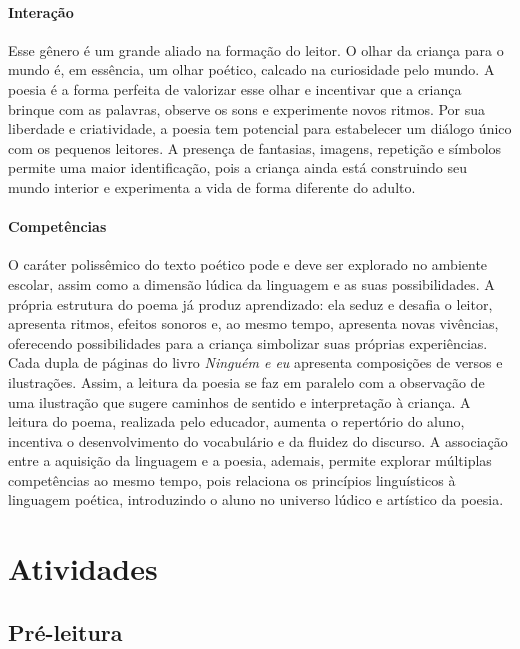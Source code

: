 \documentclass[11pt]{extarticle}
\begin{document}
\paragraph{Interação} Esse gênero é um grande aliado na formação do leitor. O olhar da criança para o mundo é, em essência, um olhar poético, calcado na curiosidade pelo mundo. A poesia é a forma perfeita de valorizar esse olhar e incentivar que a criança brinque com as palavras, observe os sons e experimente novos ritmos. Por sua liberdade e criatividade, a poesia tem potencial para estabelecer um diálogo único com os pequenos leitores. A presença de fantasias, imagens, repetição e símbolos permite uma maior identificação, pois a criança ainda está construindo seu mundo interior e experimenta a vida de forma diferente do adulto. 

\paragraph{Competências} 
O caráter polissêmico do texto poético pode e deve ser explorado no ambiente escolar, assim como a dimensão lúdica da linguagem e as suas possibilidades. A própria estrutura do poema já produz aprendizado: ela seduz e desafia o leitor, apresenta ritmos, efeitos sonoros e, ao mesmo tempo, apresenta novas vivências, oferecendo possibilidades para a criança simbolizar suas próprias experiências. Cada dupla de páginas do livro \textit{Ninguém e eu} apresenta composições de versos e ilustrações. Assim, a leitura da poesia se faz em paralelo com a observação de uma ilustração que sugere caminhos de sentido e interpretação à criança. A leitura do poema, realizada pelo educador, aumenta o repertório do aluno, incentiva o desenvolvimento do vocabulário e da fluidez do discurso. A associação entre a aquisição da linguagem e a poesia, ademais, permite explorar múltiplas competências ao mesmo tempo, pois relaciona os princípios linguísticos à linguagem poética, introduzindo o aluno no universo lúdico e artístico da poesia.

\section{Atividades}

\subsection{Pré-leitura}

\end{document}
